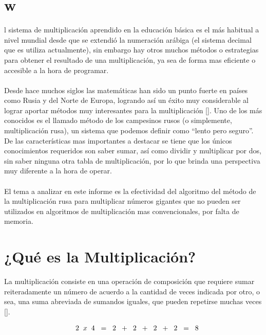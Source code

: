 \documentclass[10pt,journal,compsoc]{IEEEtran}
\begin{document}
\section{w}
\label{sec:introduction}
\fi
{}l sistema de multiplicación aprendido en la educación básica es el más habitual a nivel mundial desde que se extendió la numeración arábiga (el sistema decimal que es utiliza actualmente), sin embargo hay otros muchos métodos o estrategias para obtener el resultado de una multiplicación, ya sea de forma mas eficiente o accesible a la hora de programar.
\\\\
Desde hace muchos siglos las matemáticas han sido un punto fuerte en países como Rusia y del Norte de Europa, logrando así un éxito muy considerable al lograr aportar métodos muy interesantes para la multiplicación [\cite{RM06}].
Uno de los más conocidos es el llamado método de los campesinos rusos (o simplemente, multiplicación rusa), un sistema que podemos definir como “lento pero seguro”. De las características mas importantes a destacar se tiene que los únicos conocimientos requeridos son saber sumar, así como dividir y multiplicar por dos, sin saber ninguna otra tabla de multiplicación, por lo que brinda una perspectiva muy diferente a la hora de operar.
\\\\
El tema a analizar en este informe es la efectividad del algoritmo del método de la multiplicación rusa para multiplicar números gigantes que no pueden ser utilizados en algoritmos de multiplicación mas convencionales, por falta de memoria.

\section{¿Qué es la Multiplicación?}

La multiplicación consiste en una operación de composición que requiere sumar reiteradamente un número de acuerdo a la cantidad de veces indicada por otro, o sea, una suma abreviada de sumandos iguales, que pueden repetirse muchas veces [\cite{KPR86}].

\begin{center}
\[
\begin{array}{rl l}
& 2 \hspace{0.2cm} x \hspace{0.2cm} 4 \hspace{0.2cm} = \hspace{0.2cm} 2 \hspace{0.2cm} + \hspace{0.2cm} 2 \hspace{0.2cm} + \hspace{0.2cm} 2 \hspace{0.2cm} + \hspace{0.2cm} 2 \hspace{0.2cm} = \hspace{0.2cm} 8\\
\end{array}
\]
\end{center}
\end{document}
